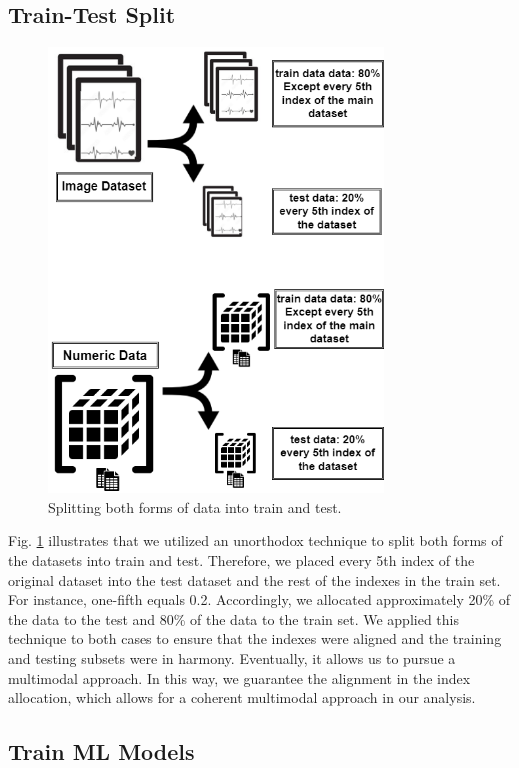 \documentclass[conference]{IEEEtran}
\begin{document}
\subsection{Train-Test Split}


\begin{figure}[htbp]
\centerline{\includegraphics[width=3.5in]{7-Splitting Dataset.png }}
\caption{Splitting both forms of data into train and test.}
\label{fig-7:Splitting Dataset}
\end{figure}


Fig. \ref{fig-7:Splitting Dataset} illustrates that we utilized an unorthodox technique to split both forms of the datasets into train and test. Therefore, we placed every 5th index of the original dataset into the test dataset and the rest of the indexes in the train set. For instance, one-fifth equals 0.2. Accordingly, we allocated approximately 20\% of the data to the test and 80\% of the data to the train set. We applied this technique to both cases to ensure that the indexes were aligned and the training and testing subsets were in harmony. Eventually, it allows us to pursue a multimodal approach. In this way, we guarantee the alignment in the index allocation, which allows for a coherent multimodal approach in our analysis.

\subsection{Train ML Models}
\end{document}
